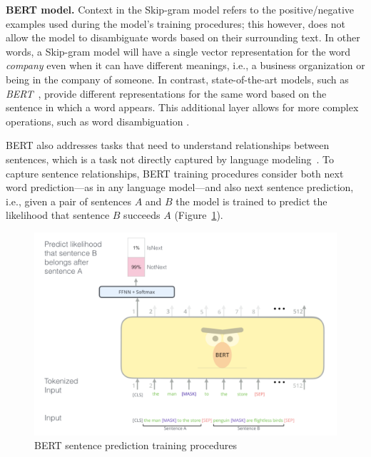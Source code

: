 \smallskip
\begin{hangparas}{.0in}{0}
    {\small \textbf{BERT model.}} Context in the Skip-gram model refers to the positive/negative examples used during the model's training procedures; this however, does not allow the model to disambiguate words based on their surrounding text. In other words, a Skip-gram model will have a single vector representation for the word \textit{company} even when it can have different meanings, i.e., a business organization or being in the company of someone. In contrast, state-of-the-art models, such as \textit{BERT}~\cite{Devlin2018Bert}, provide different representations for the same word based on the sentence in which a word appears.
    This additional layer allows for more complex operations, such as word disambiguation .
\end{hangparas}


BERT also addresses tasks that need to understand relationships between sentences, which is a task not directly captured by language modeling~\cite{Devlin2018Bert}.
To capture sentence relationships, BERT training procedures consider both next word prediction---as in any language model---and also next sentence prediction, i.e., given a pair of sentences $A$ and $B$ the model 
is trained to predict the likelihood that sentence $B$ succeeds $A$ (Figure~\ref{fig:BERT}). 


\begin{figure}
    \centering
    \includegraphics[width=.75\linewidth]{fig/cp5/BERT}
    \caption{BERT sentence prediction training procedures }
    \label{fig:BERT}
\end{figure}



